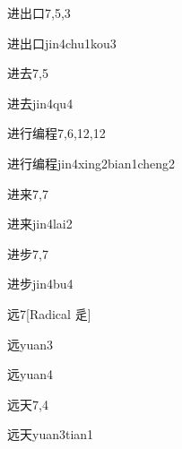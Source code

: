 \begin{entry}{进出口}{7,5,3}
  \begin{phonetics}{进出口}{jin4chu1kou3}
  \end{phonetics}
\end{entry}

\begin{entry}{进去}{7,5}
  \begin{phonetics}{进去}{jin4qu4}
  \end{phonetics}
\end{entry}

\begin{entry}{进行编程}{7,6,12,12}
  \begin{phonetics}{进行编程}{jin4xing2bian1cheng2}
  \end{phonetics}
\end{entry}

\begin{entry}{进来}{7,7}
  \begin{phonetics}{进来}{jin4lai2}
  \end{phonetics}
\end{entry}

\begin{entry}{进步}{7,7}
  \begin{phonetics}{进步}{jin4bu4}
  \end{phonetics}
\end{entry}

\begin{entry}{远}{7}[Radical 辵]
  \begin{phonetics}{远}{yuan3}
  \end{phonetics}
  \begin{phonetics}{远}{yuan4}
  \end{phonetics}
\end{entry}

\begin{entry}{远天}{7,4}
  \begin{phonetics}{远天}{yuan3tian1}
  \end{phonetics}
\end{entry}

